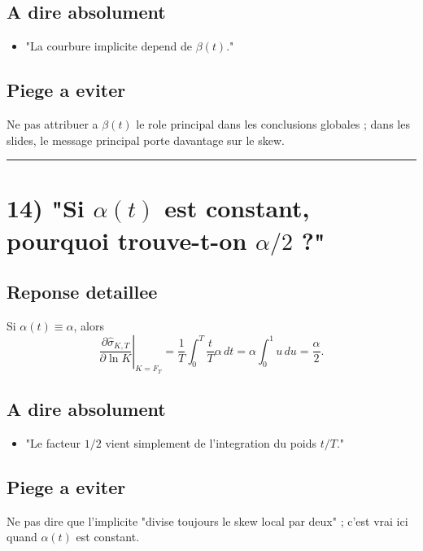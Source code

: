 \documentclass[11pt,a4paper]{article}
\begin{document}
\subsection{A dire absolument}

\begin{itemize}
\item "La courbure implicite depend de \(\beta(t)\)."
\end{itemize}

\subsection{Piege a eviter}

Ne pas attribuer a \(\beta(t)\) le role principal dans les conclusions globales ; dans les slides, le message principal porte davantage sur le skew.

\bigskip\hrule\bigskip

\section{14) "Si \(\alpha(t)\) est constant, pourquoi trouve-t-on \(\alpha/2\) ?"}

\subsection{Reponse detaillee}

Si \(\alpha(t)\equiv \alpha\), alors
\[
\left.\frac{\partial \hat{\sigma}_{K,T}}{\partial \ln K}\right|_{K=F_T}
=
\frac{1}{T}\int_0^T \frac{t}{T}\alpha\,dt
=
\alpha\int_0^1 u\,du
=
\frac{\alpha}{2}.
\]

\subsection{A dire absolument}

\begin{itemize}
\item "Le facteur \(1/2\) vient simplement de l'integration du poids \(t/T\)."
\end{itemize}

\subsection{Piege a eviter}

Ne pas dire que l'implicite "divise toujours le skew local par deux" ; c'est vrai ici quand \(\alpha(t)\) est constant.
\end{document}

